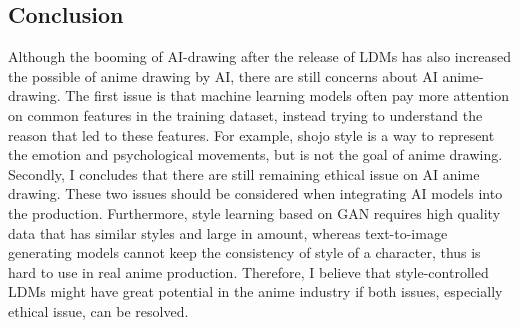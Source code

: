 \subsection*{Conclusion}

Although the booming of AI-drawing after the release of LDMs has also increased
the possible of anime drawing by AI,
there are still concerns about AI anime-drawing.
The first issue is that machine learning models often pay more attention on common features
in the training dataset,
instead trying to understand the reason that led to these features.
For example, shojo style is a way to represent the emotion and psychological movements,
but is not the goal of anime drawing.
Secondly, I concludes that there are still remaining ethical issue on AI anime drawing.
These two issues should be considered when integrating AI models into the production.
Furthermore, style learning based on GAN requires high quality data that has similar styles and large in amount,
whereas text-to-image generating models cannot keep the consistency of style of a character,
thus is hard to use in real anime production.
Therefore, I believe that style-controlled LDMs might have great potential in the anime industry if 
both issues, especially ethical issue, can be resolved.
